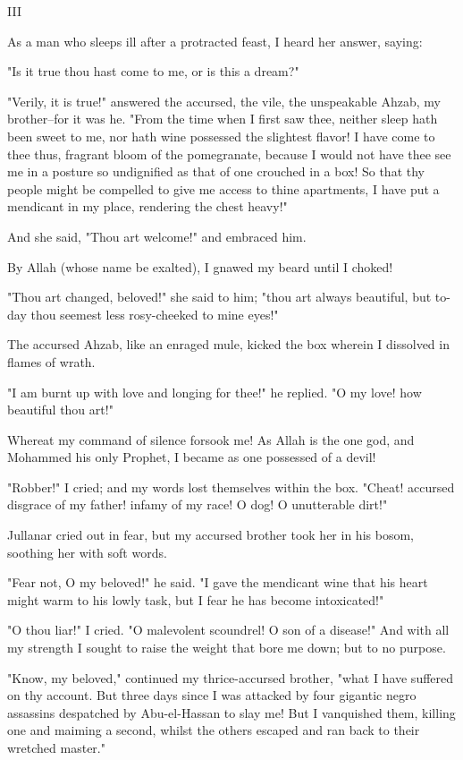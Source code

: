 III

As a man who sleeps ill after a protracted feast, I heard her answer,
saying:

"Is it true thou hast come to me, or is this a dream?"

"Verily, it is true!" answered the accursed, the vile, the unspeakable
Ahzab, my brother--for it was he. "From the time when I first saw
thee, neither sleep hath been sweet to me, nor hath wine possessed the
slightest flavor! I have come to thee thus, fragrant bloom of the
pomegranate, because I would not have thee see me in a posture so
undignified as that of one crouched in a box! So that thy people might
be compelled to give me access to thine apartments, I have put a
mendicant in my place, rendering the chest heavy!"

And she said, "Thou art welcome!" and embraced him.

By Allah (whose name be exalted), I gnawed my beard until I choked!

"Thou art changed, beloved!" she said to him; "thou art always
beautiful, but to-day thou seemest less rosy-cheeked to mine eyes!"

The accursed Ahzab, like an enraged mule, kicked the box wherein
I dissolved in flames of wrath.

"I am burnt up with love and longing for thee!" he replied. "O my
love! how beautiful thou art!"

Whereat my command of silence forsook me! As Allah is the one god,
and Mohammed his only Prophet, I became as one possessed of a devil!

"Robber!" I cried; and my words lost themselves within the box.
"Cheat! accursed disgrace of my father! infamy of my race! O dog!
O unutterable dirt!"

Jullanar cried out in fear, but my accursed brother took her in his
bosom, soothing her with soft words.

"Fear not, O my beloved!" he said. "I gave the mendicant wine that
his heart might warm to his lowly task, but I fear he has become
intoxicated!"

"O thou liar!" I cried. "O malevolent scoundrel! O son of a disease!"
And with all my strength I sought to raise the weight that bore me
down; but to no purpose.

"Know, my beloved," continued my thrice-accursed brother, "what I have
suffered on thy account. But three days since I was attacked by four
gigantic negro assassins despatched by Abu-el-Hassan to slay me! But I
vanquished them, killing one and maiming a second, whilst the others
escaped and ran back to their wretched master."

